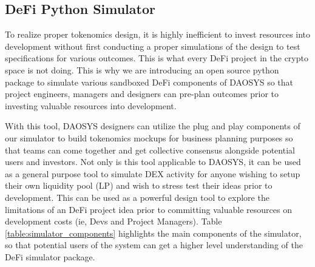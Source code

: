 \documentclass[journal,twocolumn,12pt]{ieeesyscoin}
\begin{document}
\subsection{DeFi Python Simulator}
\label{sec:python_simulator}

To realize proper tokenomics design, it is highly inefficient to invest resources into development without first conducting a proper simulations of the design to test specifications for various outcomes. This is what every DeFi project in the crypto space is not doing. This is why we are introducing an open source python package to simulate various sandboxed DeFi components of DAOSYS so that project engineers, managers and designers can pre-plan outcomes prior to investing valuable resources into development.

With this tool, DAOSYS designers can utilize the plug and play components of our simulator to build tokenomics mockups for business planning purposes so that teams can come together and get collective consensus alongside potential users and investors. Not only is this tool applicable to DAOSYS, it can be used as a general purpose tool to simulate DEX activity for anyone wishing to setup their own liquidity pool (LP) and wish to stress test their ideas prior to development. This can be used as a powerful design tool to explore the limitations of an DeFi project idea prior to committing valuable resources on development costs (ie, Devs and Project Managers). Table \ref{table:simulator_components} highlights the main components of the simulator, so that potential users of the system can get a higher level understanding of the DeFi simulator package.
\end{document}
